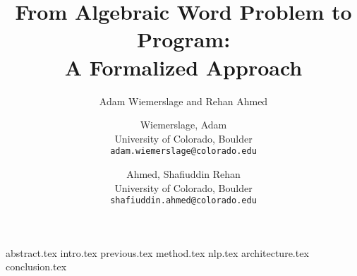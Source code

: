 \documentclass[11pt]{exam}
\title{From Algebraic Word Problem to Program: \\ A Formalized Approach}
\date{}
\author{Adam Wiemerslage and Rehan Ahmed}
\author{
  Wiemerslage, Adam\\
  University of Colorado, Boulder\\
  \texttt{adam.wiemerslage@colorado.edu}
  \and
  Ahmed, Shafiuddin Rehan\\
  University of Colorado, Boulder\\
  \texttt{shafiuddin.ahmed@colorado.edu}\\
}
\newcommand*{\sectiondir}{sections/}
\begin{document}
\maketitle

{abstract.tex}
{intro.tex}
{previous.tex}
{method.tex}
{nlp.tex}
{architecture.tex}
{conclusion.tex}
\newpage


\end{document}
